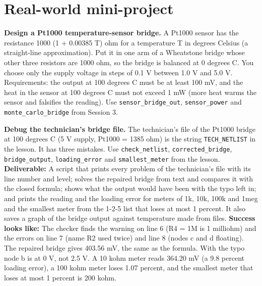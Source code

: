 \documentclass[11pt,a4paper]{article}
\begin{document}
\section{Real-world mini-project}
\textbf{Design a Pt1000 temperature-sensor bridge.} A Pt1000 sensor has the resistance 1000 (1 + 0.00385 T) ohm for a temperature T in degrees Celsius (a straight-line approximation). Put it in one arm of a Wheatstone bridge whose other three resistors are 1000 ohm, so the bridge is balanced at 0 degrees C. You choose only the supply voltage in steps of 0.1 V between 1.0 V and 5.0 V. Requirements: the output at 100 degrees C must be at least 100 mV, and the heat in the sensor at 100 degrees C must not exceed 1 mW (more heat warms the sensor and falsifies the reading). Use \texttt{sensor\_bridge\_out}, \texttt{sensor\_power} and \texttt{monte\_carlo\_bridge} from Session 3.

\textbf{Debug the technician's bridge file.} The technician's file of the Pt1000 bridge at 100 degrees C (5 V supply, Pt1000 = 1385 ohm) is the string \texttt{TECH\_NETLIST} in the lesson. It has three mistakes. Use \texttt{check\_netlist}, \texttt{corrected\_bridge}, \texttt{bridge\_output}, \texttt{loading\_error} and \texttt{smallest\_meter} from the lesson. \textbf{Deliverable:} A script that prints every problem of the technician's file with its line number and level; solves the repaired bridge from text and compares it with the closed formula; shows what the output would have been with the typo left in; and prints the reading and the loading error for meters of 1k, 10k, 100k and 1meg and the smallest meter from the 1-2-5 list that loses at most 1 percent. It also saves a graph of the bridge output against temperature made from files. \textbf{Success looks like:} The checker finds the warning on line 6 (R4 = 1M is 1 milliohm) and the errors on line 7 (name R2 used twice) and line 8 (nodes c and d floating). The repaired bridge gives 403.56 mV, the same as the formula. With the typo node b is at 0 V, not 2.5 V. A 10 kohm meter reads 364.20 mV (a 9.8 percent loading error), a 100 kohm meter loses 1.07 percent, and the smallest meter that loses at most 1 percent is 200 kohm.
\end{document}
